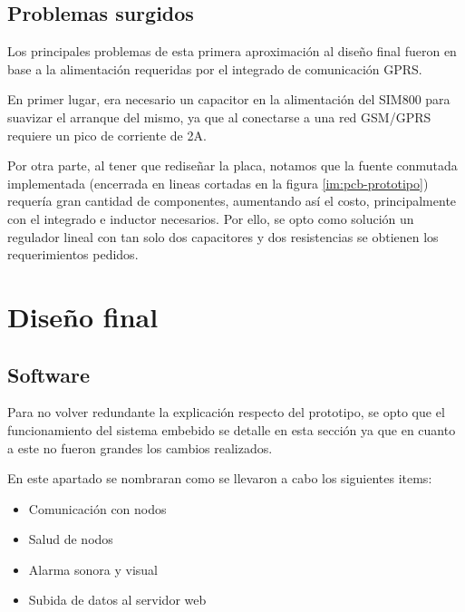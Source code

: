 \subsection{Problemas surgidos}
\par Los principales problemas de esta primera aproximación al diseño final fueron en
base a la alimentación requeridas por el integrado de comunicación GPRS.
\par En primer lugar, era necesario un capacitor en la alimentación del SIM800 para
suavizar el arranque del mismo, ya que al conectarse a una red GSM/GPRS requiere un pico
de corriente de 2A.
\par Por otra parte, al tener que rediseñar la placa, notamos que la fuente conmutada implementada (encerrada en lineas cortadas en la figura \ref{im:pcb-prototipo}) requería gran cantidad de componentes, aumentando así el costo, principalmente con el integrado e inductor necesarios. Por ello, se opto como solución un regulador lineal con tan solo dos capacitores y dos resistencias se obtienen los requerimientos pedidos. 

\section{Diseño final}
\subsection{Software}
\par Para no volver redundante la explicación respecto del prototipo, se opto que el
funcionamiento del sistema embebido se detalle en esta sección ya que en cuanto a este no
fueron grandes los cambios realizados. 
\par En este apartado se nombraran como se llevaron a cabo los siguientes items:
\begin{itemize}
    \item Comunicación con nodos
    \item Salud de nodos
    \item Alarma sonora y visual
    \item Subida de datos al servidor web
\end{itemize}

